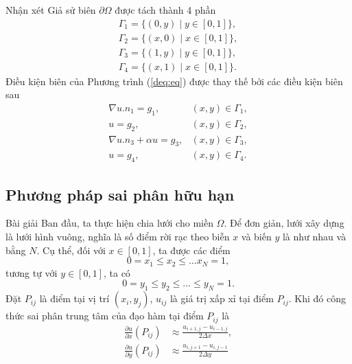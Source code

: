\documentclass[9pt]{beamer}
\numberwithin{equation}{section}
\begin{document}
\begin{frame}
\begin{exampleblock}{Nhận xét}
    Giả sử biên $\partial \Omega$ được tách thành 4 phần
    \begin{align*}
        \Gamma_1 = \{ (0,y) \mid y \in [0,1] \}, \\
        \Gamma_2 = \{ (x,0) \mid x \in [0,1] \}, \\
        \Gamma_3 = \{ (1,y) \mid y \in [0,1] \}, \\
        \Gamma_4 = \{ (x,1) \mid x \in [0,1] \}.
    \end{align*}
    Điều kiện biên của Phương trình (\ref{deq:eq}) được thay thế bởi các điều kiện biên sau
    \begin{align*}
        \nabla u . n_1 = g_1, &(x,y) \in \Gamma_1, \\
        u = g_2, &(x,y) \in \Gamma_2, \\
        \nabla u . n_3 + \alpha u = g_3, &(x,y) \in \Gamma_3, \\
        u = g_4, &(x,y) \in \Gamma_4.
    \end{align*}
\end{exampleblock}
\end{frame}

\subsection{Phương pháp sai phân hữu hạn}

\begin{frame}
\begin{exampleblock}{Bài giải}
    Ban đầu, ta thực hiện chia lưới cho miền $\Omega$. Để đơn giản, lưới xây dựng là lưới hình vuông, nghĩa là số điểm rời rạc theo biễn $x$ và biến $y$ là như nhau và bằng $N$. Cụ thể, đối với $x \in [0,1]$, ta được các điểm $$0 = x_1 \le x_2 \le \ldots x_N = 1,$$ tương tự với $y \in [0,1]$, ta có $$0 = y_1 \le y_2 \le \ldots \le y_N = 1.$$
    Đặt $P_{ij}$ là điểm tại vị trí $(x_i, y_j)$, $u_{ij}$ là giá trị xấp xỉ tại điểm $P_{ij}$. Khi đó công thức sai phân trung tâm của đạo hàm tại điểm $P_{ij}$ là
    \begin{align*}
        \frac{\partial u}{\partial x}(P_{ij})
        &\approx \frac{u_{i+1,j} - u_{i-1,j}}{2 \Delta x}, \\
        \frac{\partial u}{\partial y}(P_{ij})
        &\approx \frac{u_{i,j+1} - u_{i,j-1}}{2 \Delta y}
    \end{align*}
\end{exampleblock}
\end{frame}
\end{document}
